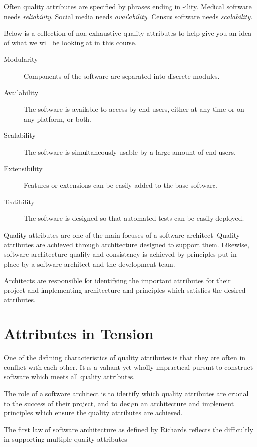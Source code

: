 Often quality attributes are specified by phrases ending in -ility.
Medical software needs \textit{reliability}.
Social media needs \textit{availability}.
Census software needs \textit{scalability}.

Below is a collection of non-exhaustive quality attributes to help give you an idea of what we will be looking at in this course.

\begin{description}
    \item[Modularity] Components of the software are separated into discrete modules.
    \item[Availability] The software is available to access by end users, either at any time or on any platform, or both.
    \item[Scalability] The software is simultaneously usable by a large amount of end users.
    \item[Extensibility] Features or extensions can be easily added to the base software.
    \item[Testibility] The software is designed so that automated tests can be easily deployed.
\end{description}

Quality attributes are one of the main focuses of a software architect.
Quality attributes are achieved through architecture designed to support them.
Likewise, software architecture quality and consistency is achieved by principles put in place by a software architect and the development team.

Architects are responsible for identifying the important attributes for their project
and implementing architecture and principles which satisfies the desired attributes.

\section{Attributes in Tension}
One of the defining characteristics of quality attributes is that they are often in conflict with each other.
It is a valiant yet wholly impractical pursuit to construct software which meets all quality attributes.

The role of a software architect is to identify which quality attributes are crucial to the success of their project,
and to design an architecture and implement principles which ensure the quality attributes are achieved.

The first law of software architecture as defined by Richards \cite{richards2020fundamentals} reflects the difficultly in supporting multiple quality attributes.

